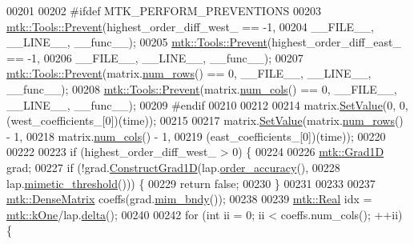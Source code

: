 \begin{DoxyCode}
00201 
00202 \textcolor{preprocessor}{  #ifdef MTK\_PERFORM\_PREVENTIONS}
00203   \hyperlink{classmtk_1_1Tools_a332324c6f25e66be9dff48c5987a3b9f}{mtk::Tools::Prevent}(highest\_order\_diff\_west\_ == -1,
00204                       \_\_FILE\_\_, \_\_LINE\_\_, \_\_func\_\_);
00205   \hyperlink{classmtk_1_1Tools_a332324c6f25e66be9dff48c5987a3b9f}{mtk::Tools::Prevent}(highest\_order\_diff\_east\_ == -1,
00206                       \_\_FILE\_\_, \_\_LINE\_\_, \_\_func\_\_);
00207   \hyperlink{classmtk_1_1Tools_a332324c6f25e66be9dff48c5987a3b9f}{mtk::Tools::Prevent}(matrix.\hyperlink{classmtk_1_1DenseMatrix_a53f3afb3b6a8d21854458aaa9663cc74}{num\_rows}() == 0, \_\_FILE\_\_, \_\_LINE\_\_, \_\_func\_\_);
00208   \hyperlink{classmtk_1_1Tools_a332324c6f25e66be9dff48c5987a3b9f}{mtk::Tools::Prevent}(matrix.\hyperlink{classmtk_1_1DenseMatrix_a41747502d468c6728a4be31501b16e0e}{num\_cols}() == 0, \_\_FILE\_\_, \_\_LINE\_\_, \_\_func\_\_);
00209 \textcolor{preprocessor}{  #endif}
00210 
00212 
00214   matrix.\hyperlink{classmtk_1_1DenseMatrix_a784ce5784109ac86bfb9d8562b334b13}{SetValue}(0, 0, (west\_coefficients\_[0])(time));
00215 
00217   matrix.\hyperlink{classmtk_1_1DenseMatrix_a784ce5784109ac86bfb9d8562b334b13}{SetValue}(matrix.\hyperlink{classmtk_1_1DenseMatrix_a53f3afb3b6a8d21854458aaa9663cc74}{num\_rows}() - 1,
00218                   matrix.\hyperlink{classmtk_1_1DenseMatrix_a41747502d468c6728a4be31501b16e0e}{num\_cols}() - 1,
00219                   (east\_coefficients\_[0])(time));
00220 
00222 
00223   \textcolor{keywordflow}{if} (highest\_order\_diff\_west\_ > 0) \{
00224 
00226     \hyperlink{classmtk_1_1Grad1D}{mtk::Grad1D} grad;
00227     \textcolor{keywordflow}{if} (!grad.\hyperlink{classmtk_1_1Grad1D_a74ef5245cfae6fd158bd7f563a0c2e52}{ConstructGrad1D}(lap.\hyperlink{classmtk_1_1Lap1D_ae3490534a9e950df3f81b3840c31b13a}{order\_accuracy}(),
00228                               lap.\hyperlink{classmtk_1_1Lap1D_a957ae4ff6053d605ac7b93650ad6f188}{mimetic\_threshold}())) \{
00229       \textcolor{keywordflow}{return} \textcolor{keyword}{false};
00230     \}
00231 
00233 
00237     \hyperlink{classmtk_1_1DenseMatrix}{mtk::DenseMatrix} coeffs(grad.\hyperlink{classmtk_1_1Grad1D_ab25e1d064a5a00fbe3777e65fd5750c0}{mim\_bndy}());
00238 
00239     \hyperlink{group__c01-roots_gac080bbbf5cbb5502c9f00405f894857d}{mtk::Real} idx = \hyperlink{group__c01-roots_ga26407c24d43b6b95480943340d285c71}{mtk::kOne}/lap.\hyperlink{classmtk_1_1Lap1D_a4e16e80c6dd845ac42bda23385a1c56e}{delta}();
00240 
00242     \textcolor{keywordflow}{for} (\textcolor{keywordtype}{int} ii = 0; ii < coeffs.num\_cols(); ++ii) \{

\end{DoxyCode}
